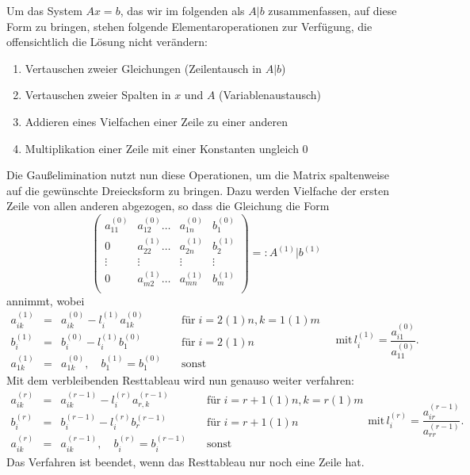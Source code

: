 Um das System $Ax=b$, das wir im folgenden als $A|b$ zusammenfassen,
auf diese Form zu bringen, stehen folgende Elementaroperationen zur
Verfügung, die offensichtlich die Lösung nicht verändern:
\begin{enumerate}
\item Vertauschen zweier Gleichungen (Zeilentausch in $A|b$)
\item Vertauschen zweier Spalten in $x$ und $A$ (Variablenaustausch)
\item Addieren eines Vielfachen einer Zeile zu einer anderen
\item Multiplikation einer Zeile mit einer Konstanten ungleich 0
\end{enumerate}
Die Gaußelimination nutzt nun diese Operationen, um die Matrix
spaltenweise auf die gewünschte Dreiecksform zu bringen. Dazu werden
Vielfache der ersten Zeile von allen anderen abgezogen, so dass die
Gleichung die Form
\begin{equation}
  \left(\begin{array}{lll|c}
      a_{11}^{(0)} & a_{12}^{(0)}\ldots &a_{1n}^{(0)} & b_1^{(0)}\\
      0     & a_{22}^{(1)}\ldots &a_{2n}^{(1)} & b_2^{(1)}\\
      \vdots& \vdots      &\vdots& \vdots\\
      0     & a_{m2}^{(1)}\ldots &a_{mn}^{(1)} & b_m^{(1)}\\
    \end{array}\right) =: A^{(1)} | b^{(1)}
\end{equation}
annimmt, wobei
\begin{equation}
  \begin{array}{rcll}
    a_{ik}^{(1)} &=& a_{ik}^{(0)} -  l_{i}^{(1)}a_{1k}^{(0)}
    & \quad\text{für}\; i=2(1)n, k=1(1)m\\[0.3em]
    b_{i}^{(1)} &=& b_{i}^{(0)} - l_{i}^{(1)} b_{1}^{(0)}
    & \quad\text{für}\; i=2(1)n \\[0.3em]
    a_{1k}^{(1)} &=& a_{1k}^{(0)},\quad b_{1}^{(1)} = b_{1}^{(0)}
    & \quad\text{sonst}
  \end{array}
  \quad\text{mit}\, l_{i}^{(1)} = \frac{a_{i1}^{(0)}}{a_{11}^{(0)}}.
\end{equation}
Mit dem verbleibenden Resttableau wird nun
genauso weiter verfahren:
\begin{equation}
  \label{eq:gausseli}
  \begin{array}{rcll}
    a_{ik}^{(r)} &=& a_{ik}^{(r-1)} -  l_{i}^{(r)}a_{r,k}^{(r-1)}
    & \quad\text{für}\; i=r+1(1)n, k=r(1)m\\[0.3em]
    b_{i}^{(r)} &=& b_{i}^{(r-1)} - l_{i}^{(r)} b_{r}^{(r-1)}
    & \quad\text{für}\; i=r+1(1)n \\[0.3em]
    a_{ik}^{(r)} &=& a_{ik}^{(r-1)},\quad b_{i}^{(r)} = b_{i}^{(r-1)}
    & \quad\text{sonst}
  \end{array}
  \text{mit}\, l_{i}^{(r)} = \frac{a_{ir}^{(r-1)}}{a_{rr}^{(r-1)}}.
\end{equation}
Das Verfahren ist beendet, wenn das Resttableau nur noch eine Zeile hat.

